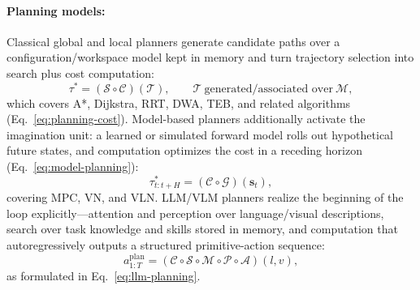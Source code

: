 \documentclass[12pt,a4paper]{article}
\newcommand{\Attn}{\mathcal{A}}
\newcommand{\Per}{\mathcal{P}}
\newcommand{\Mem}{\mathcal{M}}
\newcommand{\Srch}{\mathcal{S}}
\newcommand{\Comp}{\mathcal{C}}
\newcommand{\Imag}{\mathcal{G}}
\begin{document}
\paragraph{Planning models:}
Classical global and local planners generate candidate paths over a configuration/workspace model kept in memory and turn trajectory selection into search plus cost computation:
\begin{equation}
\tau^{*}=(\Srch\circ\Comp)(\mathcal{T}),\qquad
\mathcal{T}\ \text{generated/associated over}\ \Mem,
\label{eq:summary-planning}
\end{equation}
which covers A*, Dijkstra, RRT, DWA, TEB, and related algorithms (Eq.~\eqref{eq:planning-cost}). Model-based planners additionally activate the imagination unit: a learned or simulated forward model rolls out hypothetical future states, and computation optimizes the cost in a receding horizon (Eq.~\eqref{eq:model-planning}):
\begin{equation}
\tau^{*}_{t:t+H}=(\Comp\circ\Imag)(\mathbf{s}_{t}),
\label{eq:summary-model-planning}
\end{equation}
covering MPC, VN, and VLN. LLM/VLM planners realize the beginning of the loop explicitly---attention and perception over language/visual descriptions, search over task knowledge and skills stored in memory, and computation that autoregressively outputs a structured primitive-action sequence:
\begin{equation}
a_{1:T}^{\mathrm{plan}}=(\Comp\circ\Srch\circ\Mem\circ\Per\circ\Attn)(l,v),
\label{eq:summary-llm-planning}
\end{equation}
as formulated in Eq.~\eqref{eq:llm-planning}.
\end{document}
